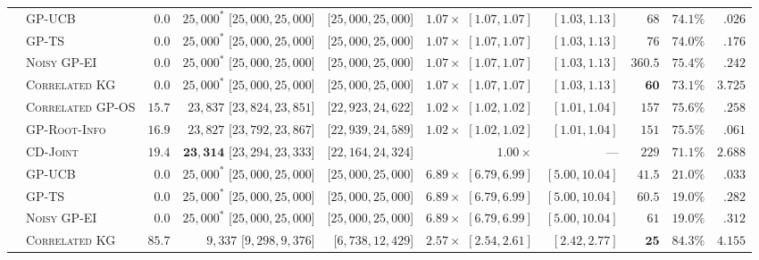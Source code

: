\documentclass{article}
\theoremstyle{plain}
\theoremstyle{definition}
\begin{document}
\begin{table}[!htbp]
{\begin{tabular}{@{}llrrrrrrrr@{}}
\midrule
{}
 & \textsc{GP-UCB} & $0.0$ & $25{,}000^*$ [$25{,}000,25{,}000$] & [$25{,}000,25{,}000$] & $1.07\times$ $[1.07,1.07]$ & $[1.03,1.13]$ & $68$ & $74.1\%$ & $.026$ \\
 & \textsc{GP-TS} & $0.0$ & $25{,}000^*$ [$25{,}000,25{,}000$] & [$25{,}000,25{,}000$] & $1.07\times$ $[1.07,1.07]$ & $[1.03,1.13]$ & $76$ & $74.0\%$ & $.176$ \\
 & \textsc{Noisy GP-EI} & $0.0$ & $25{,}000^*$ [$25{,}000,25{,}000$] & [$25{,}000,25{,}000$] & $1.07\times$ $[1.07,1.07]$ & $[1.03,1.13]$ & $360.5$ & $75.4\%$ & $.242$ \\
 & \textsc{Correlated KG} & $0.0$ & $25{,}000^*$ [$25{,}000,25{,}000$] & [$25{,}000,25{,}000$] & $1.07\times$ $[1.07,1.07]$ & $[1.03,1.13]$ & $\mathbf{60}$ & $73.1\%$ & $3.725$ \\
 & \textsc{Correlated GP-OS} & $15.7$ & $23{,}837$ [$23{,}824,23{,}851$] & [$22{,}923,24{,}622$] & $1.02\times$ $[1.02,1.02]$ & $[1.01,1.04]$ & $157$ & $75.6\%$ & $.258$ \\
 & \textsc{GP-Root-Info} & $16.9$ & $23{,}827$ [$23{,}792,23{,}867$] & [$22{,}939,24{,}589$] & $1.02\times$ $[1.02,1.02]$ & $[1.01,1.04]$ & $151$ & $75.5\%$ & $.061$ \\
 & \textsc{CD-Joint} & $\mathbf{19.4}$ & $\mathbf{23{,}314}$ [$23{,}294,23{,}333$] & [$22{,}164,24{,}324$] & $1.00\times$ & --- & $229$ & $71.1\%$ & $2.688$ \\
\midrule
{}
 & \textsc{GP-UCB} & $0.0$ & $25{,}000^*$ [$25{,}000,25{,}000$] & [$25{,}000,25{,}000$] & $6.89\times$ $[6.79,6.99]$ & $[5.00,10.04]$ & $41.5$ & $21.0\%$ & $.033$ \\
 & \textsc{GP-TS} & $0.0$ & $25{,}000^*$ [$25{,}000,25{,}000$] & [$25{,}000,25{,}000$] & $6.89\times$ $[6.79,6.99]$ & $[5.00,10.04]$ & $60.5$ & $19.0\%$ & $.282$ \\
 & \textsc{Noisy GP-EI} & $0.0$ & $25{,}000^*$ [$25{,}000,25{,}000$] & [$25{,}000,25{,}000$] & $6.89\times$ $[6.79,6.99]$ & $[5.00,10.04]$ & $61$ & $19.0\%$ & $.312$ \\
 & \textsc{Correlated KG} & $85.7$ & $9{,}337$ [$9{,}298,9{,}376$] & [$6{,}738,12{,}429$] & $2.57\times$ $[2.54,2.61]$ & $[2.42,2.77]$ & $\mathbf{25}$ & $84.3\%$ & $4.155$ \\

\end{tabular}}
\end{table}
\end{document}
